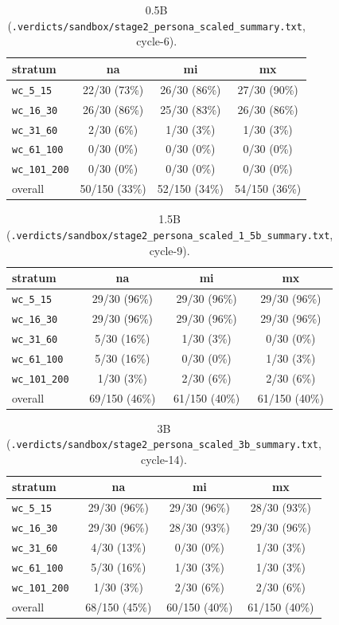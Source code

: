 \documentclass[11pt,a4paper]{article}
\newcommand{\vfile}[1]{\texttt{.verdicts/sandbox/#1}}
\begin{document}
\begin{table}[h]
\centering
\caption{0.5B (\vfile{stage2\_persona\_scaled\_summary.txt}, cycle-6).}
\begin{tabular}{lccc}
\toprule
stratum & na & mi & mx \\
\midrule
\texttt{wc\_5\_15}    & 22/30 (73\%) & 26/30 (86\%) & 27/30 (90\%) \\
\texttt{wc\_16\_30}   & 26/30 (86\%) & 25/30 (83\%) & 26/30 (86\%) \\
\texttt{wc\_31\_60}   & 2/30 (6\%)   & 1/30 (3\%)   & 1/30 (3\%) \\
\texttt{wc\_61\_100}  & 0/30 (0\%)   & 0/30 (0\%)   & 0/30 (0\%) \\
\texttt{wc\_101\_200} & 0/30 (0\%)   & 0/30 (0\%)   & 0/30 (0\%) \\
\midrule
overall & 50/150 (33\%) & 52/150 (34\%) & 54/150 (36\%) \\
\bottomrule
\end{tabular}
\end{table}

\begin{table}[h]
\centering
\caption{1.5B (\vfile{stage2\_persona\_scaled\_1\_5b\_summary.txt}, cycle-9).}
\begin{tabular}{lccc}
\toprule
stratum & na & mi & mx \\
\midrule
\texttt{wc\_5\_15}    & 29/30 (96\%) & 29/30 (96\%) & 29/30 (96\%) \\
\texttt{wc\_16\_30}   & 29/30 (96\%) & 29/30 (96\%) & 29/30 (96\%) \\
\texttt{wc\_31\_60}   & 5/30 (16\%)  & 1/30 (3\%)   & 0/30 (0\%) \\
\texttt{wc\_61\_100}  & 5/30 (16\%)  & 0/30 (0\%)   & 1/30 (3\%) \\
\texttt{wc\_101\_200} & 1/30 (3\%)   & 2/30 (6\%)   & 2/30 (6\%) \\
\midrule
overall & 69/150 (46\%) & 61/150 (40\%) & 61/150 (40\%) \\
\bottomrule
\end{tabular}
\end{table}

\begin{table}[h]
\centering
\caption{3B (\vfile{stage2\_persona\_scaled\_3b\_summary.txt}, cycle-14).}
\begin{tabular}{lccc}
\toprule
stratum & na & mi & mx \\
\midrule
\texttt{wc\_5\_15}    & 29/30 (96\%) & 29/30 (96\%) & 28/30 (93\%) \\
\texttt{wc\_16\_30}   & 29/30 (96\%) & 28/30 (93\%) & 29/30 (96\%) \\
\texttt{wc\_31\_60}   & 4/30 (13\%)  & 0/30 (0\%)   & 1/30 (3\%) \\
\texttt{wc\_61\_100}  & 5/30 (16\%)  & 1/30 (3\%)   & 1/30 (3\%) \\
\texttt{wc\_101\_200} & 1/30 (3\%)   & 2/30 (6\%)   & 2/30 (6\%) \\
\midrule
overall & 68/150 (45\%) & 60/150 (40\%) & 61/150 (40\%) \\
\bottomrule
\end{tabular}
\end{table}
\end{document}
